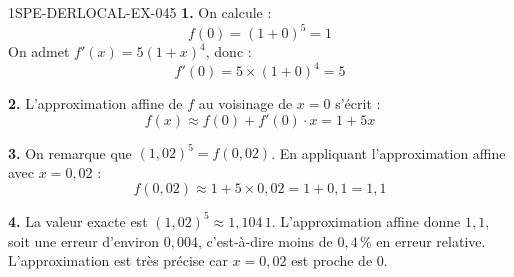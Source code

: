 \begin{corrige}{1SPE-DERLOCAL-EX-045}
\textbf{1.} On calcule :
\[
f(0) = (1 + 0)^5 = 1
\]
On admet $f'(x) = 5(1+x)^4$, donc :
\[
f'(0) = 5 \times (1+0)^4 = 5
\]

\textbf{2.} L'approximation affine de $f$ au voisinage de $x = 0$ s'écrit :
\[
f(x) \approx f(0) + f'(0) \cdot x = 1 + 5x
\]

\textbf{3.} On remarque que $(1{,}02)^5 = f(0{,}02)$. En appliquant l'approximation affine avec $x = 0{,}02$ :
\[
f(0{,}02) \approx 1 + 5 \times 0{,}02 = 1 + 0{,}1 = \boxed{1{,}1}
\]

\textbf{4.} La valeur exacte est $(1{,}02)^5 \approx 1{,}104\,1$. L'approximation affine donne $1{,}1$, soit une erreur d'environ $0{,}004$, c'est-à-dire moins de $0{,}4\,\%$ en erreur relative. L'approximation est très précise car $x = 0{,}02$ est proche de $0$.
\end{corrige}
